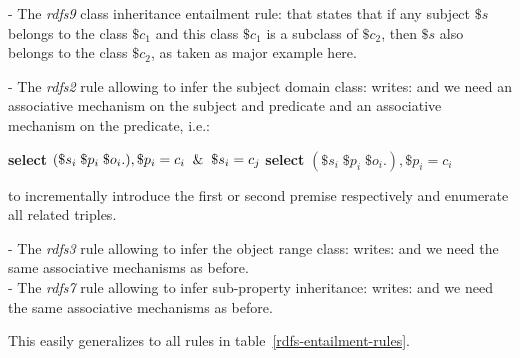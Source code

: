 - The \textit{rdfs9}  class inheritance entailment rule:
that states that if any subject $\$s$ belongs to the class $\$c_1$ and this class $\$c_1$ is a subclass of $\$c_2$, then $\$s$ also belongs to the class $\$c_2$, as taken as major example here.

- The \textit{rdfs2} rule allowing to infer the subject domain class:
writes: 
and we need an associative mechanism on the subject and predicate and an associative mechanism on the predicate, i.e.:
\begin{algorithmic}
  \State \textbf{select} $(\$s_i \; \$p_i \; \$o_i .), \$p_i = c_i \And \$s_i = c_j$
  \State \textbf{select} $(\$s_i \; \$p_i \; \$o_i .), \$p_i = c_i$
\end{algorithmic}
to incrementally introduce the first or second premise respectively and enumerate all related triples.

- The \textit{rdfs3} rule allowing to infer the object range class:
writes: 
and we need the same associative mechanisms as before.
\\- The \textit{rdfs7} rule allowing to infer sub-property inheritance:
writes: 
and we need the same associative mechanisms as before.

This easily generalizes to all rules in table~\ref{rdfs-entailment-rules}.

